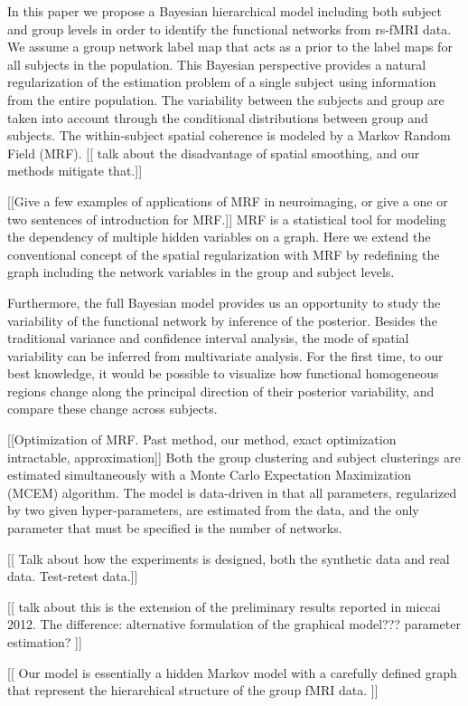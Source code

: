 \documentclass[final,authoryear,5p,twocolumn]{elsarticle}
\begin{document}
In this paper we propose a Bayesian hierarchical model including both subject
and group levels in order to identify the functional networks from rs-fMRI data.
We assume a group network label map that acts as a prior to the label maps for
all subjects in the population. This Bayesian perspective provides a natural
regularization of the estimation problem of a single subject using information
from the entire population. The variability between the subjects and group are
taken into account through the conditional distributions between group and
subjects. The within-subject spatial coherence is modeled by a Markov Random
Field (MRF). [[ talk about the disadvantage of spatial smoothing, and our
    methods mitigate that.]]

[[Give a few examples of applications of MRF in neuroimaging, or give a one or
    two sentences of introduction for MRF.]] MRF is a statistical tool for
modeling the dependency of multiple hidden variables on a graph. Here we extend
the conventional concept of the spatial regularization with MRF by redefining
the graph including the network variables in the group and subject levels.

Furthermore, the full Bayesian model provides us an opportunity to study the
variability of the functional network by inference of the posterior. Besides the
traditional variance and confidence interval analysis, the mode of spatial
variability can be inferred from multivariate analysis. For the first time, to
our best knowledge, it would be possible to visualize how functional homogeneous
regions change along the principal direction of their posterior variability, and
compare these change across subjects.

[[Optimization of MRF. Past method, our method, exact optimization intractable,
    approximation]] Both the group clustering and subject clusterings are
estimated simultaneously with a Monte Carlo Expectation Maximization (MCEM)
algorithm. The model is data-driven in that all parameters, regularized by two
given hyper-parameters, are estimated from the data, and the only parameter that
must be specified is the number of networks.

[[ Talk about how the experiments is designed, both the synthetic data and real data. Test-retest data.]]

[[ talk about this is the extension of the preliminary results reported in miccai 2012. The difference: alternative formulation of the graphical model??? parameter estimation? ]]

[[ Our model is essentially a hidden Markov model with a carefully defined graph that represent the hierarchical structure of the group fMRI data. ]]
\end{document}
